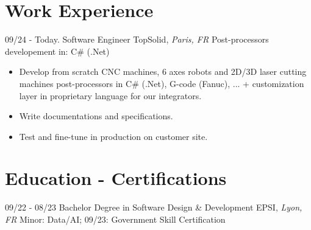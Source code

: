 \documentclass[]{friggeri-cv}
\begin{document}
\section{Work Experience}
\vspace*{-0.25cm}
\begin{entrylist}
    \entry
    {09/24 - Today.}
    {Software Engineer}
    {TopSolid, \textit{Paris, FR}}
    {Post-processors developement in: C\# (.Net)}
\end{entrylist}
\vspace{-15pt}
\vspace{0.5mm}
\begin{itemize}
    \setlength{\itemsep}{1pt}
    \setlength{\parskip}{0pt}
    \setlength{\parsep}{0pt}
\item Develop from scratch CNC machines, 6 axes robots and 2D/3D laser cutting machines post-processors in C\# (.Net), G-code (Fanuc), ... + customization layer in proprietary language for our integrators.
\item Write documentations and specifications.
\item Test and fine-tune in production on customer site.
\end{itemize}
\vspace*{-0.5cm}
\vspace*{0.45cm}
\section{Education - Certifications}
\vspace*{-0.25cm}
\vspace{0.5mm}
\begin{entrylist}
    \entry
    {09/22 - 08/23}
    {Bachelor Degree in Software Design \& Development}
    {EPSI, \textit{Lyon, FR}}
    {Minor: Data/AI; \hspace{7mm} 09/23: Government Skill Certification}
\end{entrylist}
\vspace{0.5mm}
\end{document}
